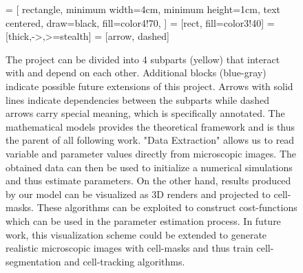 \documentclass{article}
\begin{document}
\begin{figure}
    \centering
     = [
        rectangle,
        minimum width=4cm,
        minimum height=1cm,
        text centered,
        draw=black,
        fill=color4!70,
    ]
     = [rect, fill=color3!40]
     = [thick,->,>=stealth]
     = [arrow, dashed]
    \caption{
        The project can be divided into 4 subparts (yellow) that interact with and depend on each
        other.
        Additional blocks (blue-gray) indicate possible future extensions of this project.
        Arrows with solid lines indicate dependencies between the subparts while dashed arrows carry
        special meaning, which is specifically annotated.
        The mathematical models provides the theoretical framework and is thus the parent of all
        following work.
        "Data Extraction" allows us to read variable and parameter values directly from microscopic
        images.
        The obtained data can then be used to initialize a numerical simulations and thus estimate
        parameters.
        On the other hand, results produced by our model can be visualized as 3D renders and
        projected to cell-masks.
        These algorithms can be exploited to construct cost-functions which can be used in the
        parameter estimation process.
        In future work, this visualization scheme could be extended to generate realistic
        microscopic images with cell-masks and thus train cell-segmentation and cell-tracking
        algorithms.
    }
    \label{fig:flowchart-project-structure}
\end{figure}
\end{document}
